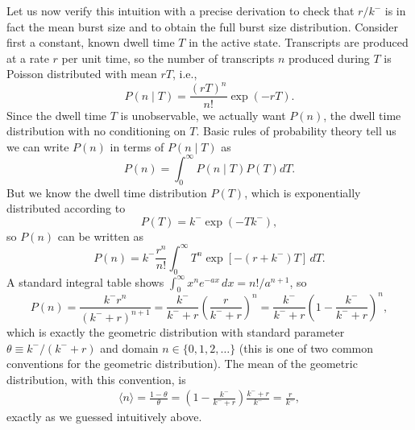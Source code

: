 Let us now verify this intuition with a precise derivation to check that $r/k^-$
is in fact the mean burst size and to obtain the full burst size distribution.
Consider first a constant, known dwell time $T$ in the active state. Transcripts
are produced at a rate $r$ per unit time, so the number of transcripts $n$
produced during $T$ is Poisson distributed with mean $rT$, i.e.,
\begin{equation}
    P(n\mid T) = \frac{(rT)^n}{n!} \exp(-rT).
\end{equation}
Since the dwell time $T$ is unobservable, we actually want $P(n)$, the dwell
time distribution with no conditioning on $T$. Basic rules of probability theory
tell us we can write $P(n)$ in terms of $P(n\mid T)$ as
\begin{equation}
    P(n) =\int_0^\infty P(n\mid T) P(T) dT.
\end{equation}
But we know the dwell time distribution $P(T)$, which is exponentially
distributed according to
\begin{equation}
    P(T) = k^- \exp(-T k^-),
\end{equation}
so $P(n)$ can be written as
\begin{equation}
    P(n) = k^- \frac{r^n}{n!}
            \int_0^\infty T^n\exp[-(r + k^-)T]\,dT.
\end{equation}
A standard integral table shows $\int_0^\infty x^n e^{-ax}\,dx = n!/a^{n+1}$, so
\begin{equation}
    P(n) = \frac{k^- r^n}{(k^- + r)^{n+1}}
        = \frac{k^-}{k^- + r}
            \left(\frac{r}{k^- + r}\right)^n
        = \frac{k^-}{k^- + r}
            \left(1 - \frac{k^-}{k^- + r}\right)^n,
\end{equation}
which is exactly the geometric distribution with standard parameter
$\theta\equiv k^-/(k^- + r)$ and domain $n \in \{0, 1, 2, \dots\}$ (this is one
of two common conventions for the geometric distribution). The mean of the
geometric distribution, with this convention, is
\begin{align}
\langle n\rangle = \frac{1 - \theta}{\theta}
        = \left(1 - \frac{k^-}{k^- + r}\right)
                    \frac{k^- + r}{k^-}
        = \frac{r}{k^-},
\end{align}
exactly as we guessed intuitively above.

